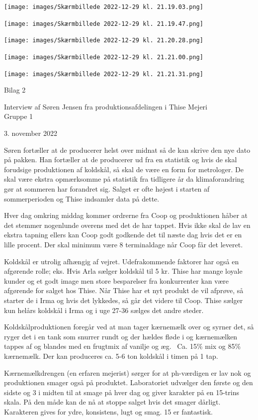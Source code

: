 \documentclass[
  12pt,
  a4paper,
  DIV=11,
  numbers=noendperiod]{scrartcl}
\begin{document}
\texttt{[image: images/Skærmbillede 2022-12-29 kl. 21.19.03.png]}

\texttt{[image: images/Skærmbillede 2022-12-29 kl. 21.19.47.png]}

\texttt{[image: images/Skærmbillede 2022-12-29 kl. 21.20.28.png]}

\texttt{[image: images/Skærmbillede 2022-12-29 kl. 21.21.00.png]}

\texttt{[image: images/Skærmbillede 2022-12-29 kl. 21.21.31.png]}

Bilag 2~

Interview af Søren Jensen fra produktionsafdelingen i Thise Mejeri ~\\
Gruppe 1~

3. november 2022~

Søren fortæller at de producerer helst over midnat så de kan skrive den
nye dato på pakken. Han fortæller at de producerer ud fra en statistik
og hvis de skal forudsige produktionen af koldskål, så skal de være en
form for metrologer. De skal være ekstra opmærksomme på statistik fra
tidligere år da klimaforandring gør at sommeren har forandret sig.
Salget er ofte højest i starten af sommerperioden og Thise indsamler
data på dette.

Hver dag omkring middag kommer ordrerne fra Coop og produktionen håber
at det stemmer nogenlunde overens med det de har tappet. Hvis ikke skal
de lav en ekstra tapning ellers kan Coop godt godkende det til næste dag
hvis det er en lille procent. Der skal minimum være 8 terminaldage når
Coop får det leveret.~~

Koldskål er utrolig afhængig af vejret. Udefrakommende faktorer har også
en afgørende rolle; eks. Hvis Arla sælger koldskål til 5 kr. Thise har
mange loyale kunder og et godt image men store besparelser fra
konkurrenter kan være afgørende for salget hos Thise. Når Thise har et
nyt produkt de vil afprøve, så starter de i Irma og hvis det lykkedes,
så går det videre til Coop. Thise sælger kun helårs koldskål i Irma og i
uge 27-36 sælges det andre steder.~~

Koldskålproduktionen foregår ved at man tager kærnemælk over og syrner
det, så ryger det i en tank som snurrer rundt og der hældes fløde i og
kærnemælken tappes af og blandes med en frugtmix af vanilje og æg.~ Ca.
15\% mix og 85\% kærnemælk. Der kan produceres ca. 5-6 ton koldskål i
timen på 1 tap.~~

Kærnemælkdrengen (en erfaren mejerist) sørger for at ph-værdigen er lav
nok og produktionen smager også på produktet. Laboratoriet udvælger den
første og den sidste og 3 i midten til at smage på hver dag og giver
karakter på en 15-trins skala. På den måde kan de nå at stoppe salget
hvis det smager dårligt. Karakteren gives for ydre, konsistens, lugt og
smag. 15 er fantastisk.~
\end{document}
